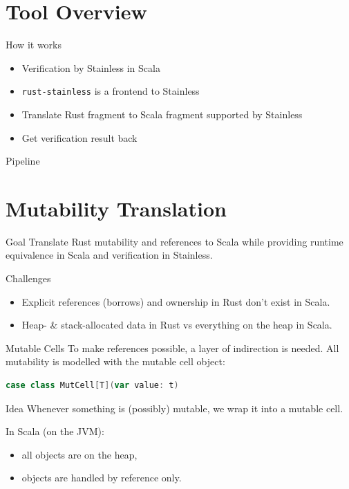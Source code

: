 \section{Tool Overview}

\begin{frame}{How it works}
\begin{itemize}
  \item Verification by Stainless in Scala
  \item \texttt{rust-stainless} is a frontend to Stainless
  \item Translate Rust fragment to Scala fragment supported by Stainless
  \item Get verification result back
\end{itemize}
\end{frame}

\begin{frame}{Pipeline}
\centering

\end{frame}




\section{Mutability Translation}

\begin{frame}{Goal}
Translate Rust mutability and references to Scala while providing runtime
equivalence in Scala and verification in Stainless.
\end{frame}

\begin{frame}{Challenges}
\begin{itemize}
\item Explicit references (borrows) and ownership in Rust don't exist in Scala.
\item Heap- \& stack-allocated data in Rust vs everything on the heap in Scala.
\end{itemize}
\end{frame}


\begin{frame}[fragile]{Mutable Cells}
To make references possible, a layer of indirection is needed. All mutability is
modelled with the mutable cell object:
\begin{lstlisting}[language=Scala, style=short]
case class MutCell[T](var value: t)
\end{lstlisting}
\vfill
\begin{block}{Idea}
Whenever something is (possibly) mutable, we wrap it into a mutable cell.
\end{block}
\vfill
In Scala (on the JVM):
\begin{itemize}
  \item all objects are on the heap,
  \item objects are handled by reference only.
\end{itemize}
\end{frame}

